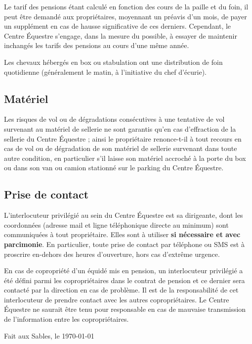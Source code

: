 \documentclass[11pt,a4paper]{article}
\begin{document}
Le tarif des pensions étant calculé en fonction des cours de la paille et du foin, il peut être demandé aux propriétaires, moyennant un préavis d'un mois, de payer un supplément en cas de hausse significative de ces derniers. Cependant, le Centre Équestre s'engage, dans la mesure du possible, à essayer de maintenir inchangés les tarifs des pensions au cours d'une même année.

Les chevaux hébergés en box ou stabulation ont une distribution de foin quotidienne (généralement le matin, à l'initiative du chef d'écurie).

\subsection*{Matériel}
Les risques de vol ou de dégradations consécutives à une tentative de vol survenant au matériel de sellerie ne sont garantis qu'en cas d'effraction de la sellerie du Centre Équestre ; ainsi le propriétaire renonce-t-il à tout recours en cas de vol ou de dégradation de son matériel de sellerie survenant dans toute autre condition, en particulier s'il laisse son matériel accroché à la porte du box ou dans son van ou camion stationné sur le parking du Centre Équestre.

\subsection*{Prise de contact}
	L'interlocuteur privilégié au sein du Centre Équestre est sa dirigeante, dont les coordonnées (adresse mail et ligne téléphonique directe au minimum) sont communiquées à tout propriétaire. Elles sont à utiliser \textbf{si nécessaire et avec parcimonie}. En particulier, toute prise de contact par téléphone ou SMS est à proscrire en-dehors des heures d'ouverture, hors cas d'extrême urgence.

	En cas de copropriété d'un équidé mis en pension, un interlocuteur privilégié a été défini parmi les copropriétaires dans le contrat de pension et ce dernier sera contacté par la direction en cas de problème. Il est de la responsabilité de cet interlocuteur de prendre contact avec les autres copropriétaires. Le Centre Équestre ne saurait être tenu pour responsable en cas de mauvaise transmission de l'information entre les copropriétaires.

\vfill
\begin{flushright}
	Fait aux Sables, le \today
\end{flushright}
\end{document}
